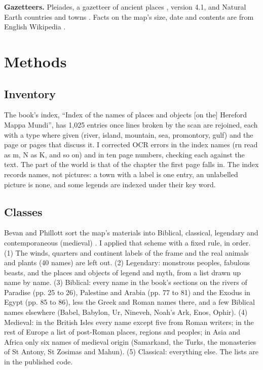 \documentclass[11pt,a4paper]{article}
\begin{document}
\textbf{Gazetteers.} Pleiades, a gazetteer of ancient places \citep{pleiades}, version 4.1, and Natural Earth countries and towns \citep{naturalearth}. Facts on the map's size, date and contents are from English Wikipedia \citep{wiki}.

\section{Methods}
\subsection{Inventory}
The book's index, ``Index of the names of places and objects [on the] Hereford Mappa Mundi'', has 1,025 entries once lines broken by the scan are rejoined, each with a type where given (river, island, mountain, sea, promontory, gulf) and the page or pages that discuss it. I corrected OCR errors in the index names (rn read as m, N as K, and so on) and in ten page numbers, checking each against the text. The part of the world is that of the chapter the first page falls in. The index records names, not pictures: a town with a label is one entry, an unlabelled picture is none, and some legends are indexed under their key word.

\subsection{Classes}
Bevan and Phillott sort the map's materials into Biblical, classical, legendary and contemporaneous (medieval) \citep[Introduction, section 11]{bevan}. I applied that scheme with a fixed rule, in order. (1) The winds, quarters and continent labels of the frame and the real animals and plants (40 names) are left out. (2) Legendary: monstrous peoples, fabulous beasts, and the places and objects of legend and myth, from a list drawn up name by name. (3) Biblical: every name in the book's sections on the rivers of Paradise (pp. 25 to 26), Palestine and Arabia (pp. 77 to 81) and the Exodus in Egypt (pp. 85 to 86), less the Greek and Roman names there, and a few Biblical names elsewhere (Babel, Babylon, Ur, Nineveh, Noah's Ark, Enos, Ophir). (4) Medieval: in the British Isles every name except five from Roman writers; in the rest of Europe a list of post-Roman places, regions and peoples; in Asia and Africa only six names of medieval origin (Samarkand, the Turks, the monasteries of St Antony, St Zosimas and Mahun). (5) Classical: everything else. The lists are in the published code.
\end{document}
